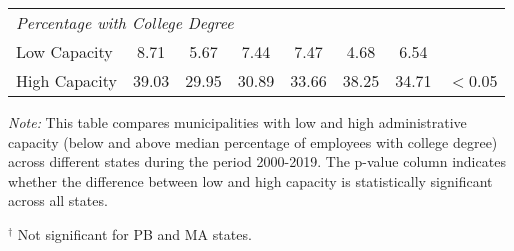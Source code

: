 \documentclass[12pt]{article}
\begin{document}
\begin{table}[htbp]
\begin{threeparttable}
\begin{adjustbox}{max width=\textwidth}
\begin{tabular}{lccccccc}
\multicolumn{8}{l}{\textit{Percentage with College Degree}} \\
\quad Low Capacity & 8.71 & 5.67 & 7.44 & 7.47 & 4.68 & 6.54 & \\
\quad High Capacity & 39.03 & 29.95 & 30.89 & 33.66 & 38.25 & 34.71 & $<$0.05 \\
\bottomrule
\end{tabular}
\end{adjustbox}
\begin{tablenotes}
\small
\item \textit{Note:} This table compares municipalities with low and high administrative capacity (below and above median percentage of employees with college degree) across different states during the period 2000-2019. The p-value column indicates whether the difference between low and high capacity is statistically significant across all states.
\item $^{\dag}$ Not significant for PB and MA states.
\end{tablenotes}
\end{threeparttable}
\end{table}
\end{document}
